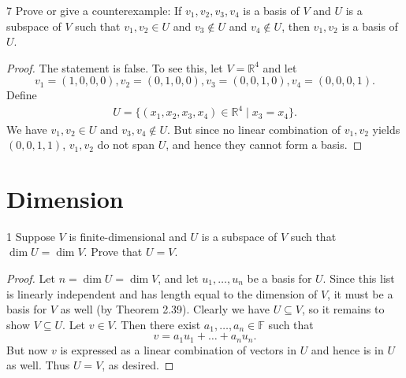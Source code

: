 \documentclass[11pt]{extarticle}
\newenvironment{problem}[1]{\begin{prob*}{#1}{}}{\end{prob*}}
\newcommand{\R}{\mathbb{R}}
\newcommand{\F}{\mathbb{F}}
\begin{document}
\begin{problem}{7}
Prove or give a counterexample: If $v_1,v_2,v_3,v_4$ is a basis of $V$ and $U$ is a subspace of $V$ such that $v_1,v_2\in U$ and $v_3\not\in U$ and $v_4\not\in U$, then $v_1,v_2$ is a basis of $U$.
\end{problem}
\begin{proof}
The statement is false.  To see this, let $V = \R^4$ and let 
\begin{equation*}
v_1=(1,0,0,0), v_2=(0,1,0,0), v_3=(0,0,1,0), v_4=(0,0,0,1). 
\end{equation*} 
Define
\begin{align*}
U=\{(x_1,x_2,x_3,x_4)\in\R^4\mid x_3 = x_4\}.
\end{align*}
We have $v_1, v_2\in U$ and $v_3,v_4\not\in U$.  But since no linear combination of $v_1,v_2$ yields $(0, 0, 1, 1)$, $v_1,v_2$ do not span $U$, and hence they cannot form a basis. 
\end{proof}



\section{Dimension}

\begin{problem}{1}
Suppose $V$ is finite-dimensional and $U$ is a subspace of $V$ such that $\dim{U} = \dim{V}$.  Prove that $U=V$.
\end{problem}
\begin{proof}
Let $n=\dim{U}=\dim{V}$, and let $u_1,\dots, u_n$ be a basis for $U$.  Since this list is linearly independent and has length equal to the dimension of $V$, it must be a basis for $V$ as well (by Theorem 2.39).  Clearly we have $U\subseteq V$, so it remains to show $V\subseteq U$.  Let $v\in V$.  Then there exist $a_1,\dots,a_n\in\F$ such that 
\begin{equation*}
v = a_1u_1 + \dots + a_nu_n.
\end{equation*}
But now $v$ is expressed as a linear combination of vectors in $U$ and hence is in $U$ as well.  Thus $U=V$, as desired.
\end{proof}
\end{document}
